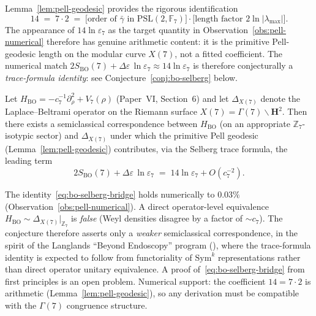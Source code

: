 \begin{remark}
\label{rem:fourteen-arithmetic}
Lemma~\ref{lem:pell-geodesic} provides the rigorous identification
\begin{equation}\label{eq:fourteen-as-7times2}
  14 \;=\; 7 \cdot 2
  \;=\; \bigl[\text{order of }\bar\gamma \text{ in }
    \mathrm{PSL}(2,\mathbb{F}_7)\bigr]
  \cdot
  \bigl[\text{length factor } 2\ln|\lambda_{\max}|\bigr].
\end{equation}
The appearance of $14\ln\varepsilon_7$ as the target quantity in
Observation~\ref{obs:pell-numerical} therefore has genuine
arithmetic content: it is the primitive Pell-geodesic length on
the modular curve $X(7)$, not a fitted coefficient.  The
numerical match $2S_{\mathrm{BO}}(7) + \Delta\varepsilon\,
\ln\varepsilon_7 \approx 14\ln\varepsilon_7$ is therefore
conjecturally a \emph{trace-formula identity}: see
Conjecture~\ref{conj:bo-selberg} below.
\end{remark}

\begin{conjecture}
\label{conj:bo-selberg}
Let $H_{\mathrm{BO}} = -c_7^{-1}\partial_\rho^2 + V_7(\rho)$
(Paper~VI, Section~6) and let $\Delta_{X(7)}$ denote the
Laplace--Beltrami operator on the Riemann surface
$X(7) = \Gamma(7)\backslash\mathbf{H}^2$.
Then there exists a semiclassical correspondence between
$H_{\mathrm{BO}}$ (on an appropriate $\mathbb{Z}_7$-isotypic
sector) and $\Delta_{X(7)}$ under which the primitive Pell
geodesic (Lemma~\ref{lem:pell-geodesic}) contributes, via the
Selberg trace formula, the leading term
\begin{equation}\label{eq:bo-selberg-bridge}
  2S_{\mathrm{BO}}(7) + \Delta\varepsilon\,\ln\varepsilon_7
  \;=\; 14\ln\varepsilon_7 + O(c_7^{-2}).
\end{equation}
\end{conjecture}
\begin{remark}
\label{rem:bo-selberg-status}
The identity~\eqref{eq:bo-selberg-bridge} holds numerically
to $0.03\%$ (Observation~\ref{obs:pell-numerical}).  A direct
operator-level equivalence $H_{\mathrm{BO}} \sim \Delta_{X(7)}|_{\mathbb{Z}_7}$
is \emph{false} (Weyl densities disagree by a factor of
$\sim c_7$).  The conjecture therefore asserts only a
\emph{weaker} semiclassical correspondence, in the spirit of the
Langlands ``Beyond Endoscopy'' program
(\citealt{Langlands2004,FrenkelLanglandsNgo2010}), where the
trace-formula identity is expected to follow from functoriality
of $\mathrm{Sym}^k$ representations rather than direct operator
unitary equivalence.  A proof of~\eqref{eq:bo-selberg-bridge}
from first principles is an open problem.
Numerical support: the coefficient $14 = 7\cdot 2$ is arithmetic
(Lemma~\ref{lem:pell-geodesic}), so any derivation must be
compatible with the $\Gamma(7)$ congruence structure.
\end{remark}


